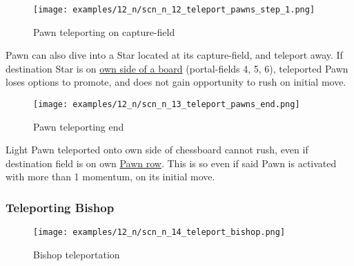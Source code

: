 \clearpage %

\vspace*{-2.0\baselineskip}
\noindent
\begin{figure}[!h]
\texttt{[image: examples/12\_n/scn\_n\_12\_teleport\_pawns\_step\_1.png]}
\caption{Pawn teleporting on capture-field}
\label{fig:scn_n_12_teleport_pawns_step_1}
\end{figure}

Pawn can also dive into a Star located at its capture-field, and teleport away.
If destination Star is on
\hyperref[sec:Definitions/Chessboard sides, navigation]{own side of a board} (portal-fields
4, 5, 6), teleported Pawn loses options to promote, and does not gain opportunity
to rush on initial move.

\clearpage %

\vspace*{-2.0\baselineskip}
\noindent
\begin{figure}[!h]
\texttt{[image: examples/12\_n/scn\_n\_13\_teleport\_pawns\_end.png]}
\caption{Pawn teleporting end}
\label{fig:scn_n_13_teleport_pawns_end}
\end{figure}

Light Pawn teleported onto own side of chessboard cannot rush, even if
destination field is on own \hyperref[sec:Terms/Pawn row]{Pawn row}. This
is so even if said Pawn is activated with more than 1 momentum, on its
initial move.

\clearpage %

\subsubsection*{Teleporting Bishop}
\label{sec:Nineteen/Star/Teleporting pieces/Teleporting Bishop}

\vspace*{-1.4\baselineskip}
\noindent
\begin{figure}[!h]
\texttt{[image: examples/12\_n/scn\_n\_14\_teleport\_bishop.png]}
\caption{Bishop teleportation}
\label{fig:scn_n_14_teleport_bishop}
\end{figure}

